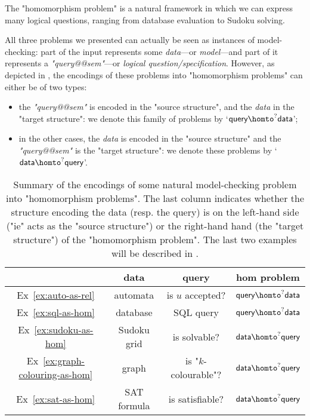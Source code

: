 \begin{known}
	The "homomorphism problem" is a natural framework in which we can express many
	logical questions, ranging from database evaluation to Sudoku solving.
\end{known}

All three problems we presented can actually be seen as instances of model-checking:
part of the input represents some \emph{data}---or \emph{model}---and part of it represents a
\emph{"query@@sem"}---or \emph{logical question/specification}.
However, as depicted in , 
the encodings of these problems into "homomorphism problems" can either be of two types:
\begin{itemize}
	\item the \emph{"query@@sem"} is encoded in the "source structure",
		and the \emph{data} in the "target structure": we denote
		this family of problems by `$\textsf{query} \homto^? \textsf{data}$';
	\item in the other cases, the \emph{data} is encoded in the "source structure"
		and the \emph{"query@@sem"} is the "target structure": we denote
		these problems by `$\textsf{data} \homto^? \textsf{query}$'.
\end{itemize}
\begin{table}[h]
	\centering
	\begin{tabular}{cccc}
		\toprule 
		& data & query & hom problem \\ \midrule 
		Ex~\ref{ex:auto-as-rel} & automata & is $u$ accepted? & $\textsf{query} \homto^? \textsf{data}$ \\
		Ex~\ref{ex:sql-as-hom} & database & SQL query & $\textsf{query} \homto^? \textsf{data}$ \\
		Ex~\ref{ex:sudoku-as-hom} & Sudoku grid & is solvable? & $\textsf{data} \homto^? \textsf{query}$ \\
		Ex~\ref{ex:graph-colouring-as-hom} & graph &
		is "$k$-colourable"? & $\textsf{data} \homto^? \textsf{query}$ \\
		Ex~\ref{ex:sat-as-hom} & SAT formula &
		is satisfiable? & $\textsf{data} \homto^? \textsf{query}$ \\ \bottomrule
	\end{tabular}
	\caption{\AP\label{tab:examples-encodings-in-hom}
		Summary of the encodings of some
		natural model-checking problem into "homomorphism problems".
		The last column indicates whether the structure encoding the data
		(resp. the query) is on the left-hand side ("ie" acts as the "source structure")
		or the right-hand hand (the "target structure")
		of the "homomorphism problem".
		The last two examples will be described in .
	}
\end{table}

